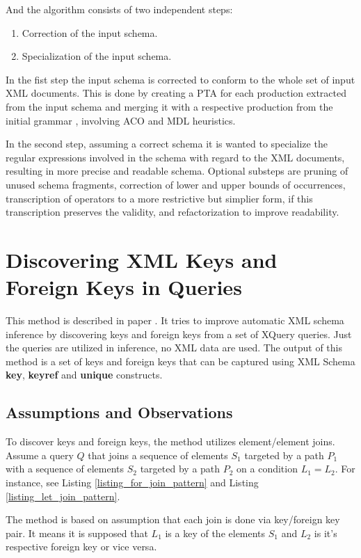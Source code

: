 And the algorithm consists of two independent steps:

\begin{enumerate}
\item Correction of the input schema.
\item Specialization of the input schema.
\end{enumerate}

In the fist step the input schema is corrected to conform to the whole set of input XML documents. This is done by creating a PTA  for each production extracted from the input schema and merging it with a respective production from the initial grammar , involving ACO and MDL heuristics.

In the second step, assuming a correct schema it is wanted to specialize the regular expressions involved in the schema with regard to the XML documents, resulting in more precise and readable schema. Optional substeps are pruning of unused schema fragments, correction of lower and upper bounds of occurrences, transcription of operators to a more restrictive but simplier form, if this transcription preserves the validity, and refactorization to improve readability.

\section{Discovering XML Keys and Foreign Keys in Queries}
This method is described in paper \cite{Necasky:2009:DXK:1529282.1529414}. It tries to improve automatic XML schema inference by discovering keys and foreign keys from a set of XQuery queries. Just the queries are utilized in inference, no XML data are used. The output of this method is a set of keys and foreign keys that can be captured using XML Schema \textbf{key}, \textbf{keyref} and \textbf{unique} constructs.

\subsection{Assumptions and Observations}
To discover keys and foreign keys, the method utilizes element/element joins. Assume a query $Q$ that joins a sequence of elements $S_1$ targeted by a path $P_1$ with a sequence of elements $S_2$ targeted by a path $P_2$ on a condition $L_1 = L_2$. For instance, see Listing \ref{listing_for_join_pattern} and Listing \ref{listing_let_join_pattern}.

The method is based on assumption that each join is done via key/foreign key pair. It means it is supposed that $L_1$ is a key of the elements $S_1$ and $L_2$ is it's respective foreign key or vice versa.

